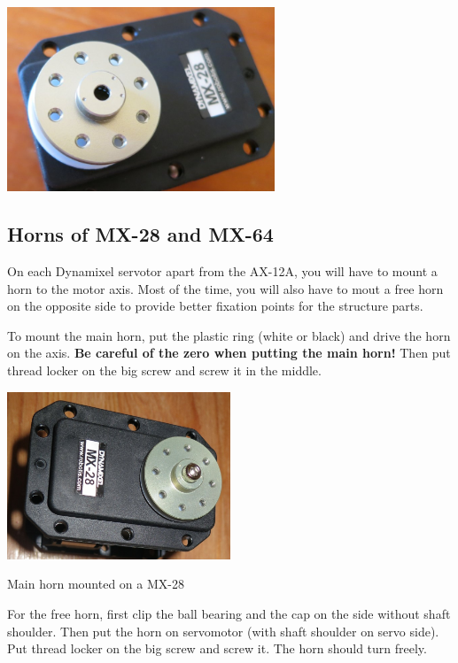 \documentclass{article}
\begin{document}
 \begin{center}
  \includegraphics[width=0.6\textwidth]{img/zero3}
 \end{center}
\subsection{Horns of MX-28 and MX-64}

On each Dynamixel servotor apart from the AX-12A, you will have to mount a horn to the motor axis. Most of the time, you will also have to mout a free horn on the opposite side to provide better fixation points for the structure parts.

To mount the main horn, put the plastic ring (white or black) and drive the horn on the axis. \textbf{Be careful of the zero when putting the main horn!} Then put thread locker on the big screw and screw it in the middle.


 \begin{center}
  \includegraphics[width=0.5\textwidth]{img/MX28N}

Main horn mounted on a MX-28
 \end{center} 
 
 For the free horn, first clip the ball bearing and the cap on the side without shaft shoulder. Then put the horn on servomotor (with shaft shoulder on servo side). Put thread locker on the big screw and screw it. The horn should turn freely.
\end{document}
